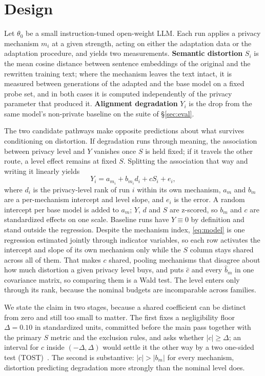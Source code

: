 \section{\label{sec:design}Design}
Let $\theta_0$ be a small instruction-tuned open-weight LLM.
Each run applies a privacy mechanism $m_i$ at a given strength,
acting on either the adaptation data or the adaptation procedure,
and yields two measurements.
\textbf{Semantic distortion} $S_i$ is the mean cosine distance between sentence embeddings of the original and the rewritten training text;
where the mechanism leaves the text intact,
it is measured between generations of the adapted and the base model on a fixed probe set,
and in both cases it is computed independently of the privacy parameter that produced it.
\textbf{Alignment degradation} $Y_i$ is the drop from the same model's non-private baseline on the suite of \S\ref{sec:eval}.

The two candidate pathways make opposite predictions about what survives conditioning on distortion.
If degradation runs through meaning,
the association between privacy level and $Y$ vanishes once $S$ is held fixed;
if it travels the other route,
a level effect remains at fixed $S$. Splitting the association that way and writing it linearly yields
\begin{equation}
  Y_i = a_{m_i} + b_{m_i} d_i + c S_i + e_i,
  \label{eq:model}
\end{equation}
where $d_i$ is the privacy-level rank of run $i$ within its own mechanism,
$a_m$ and $b_m$ are a per-mechanism intercept and level slope,
and $e_i$ is the error.
A random intercept per base model is added to $a_m$;
$Y$,
$d$ and $S$ are z-scored,
so $b_m$ and $c$ are standardized effects on one scale.
Baseline runs have $Y \equiv 0$ by definition and stand outside the regression.
Despite the mechanism index,
\eqref{eq:model} is one regression estimated jointly through indicator variables,
so each row activates the intercept and slope of its own mechanism only while the $S$ column stays shared across all of them.
That makes $c$ shared,
pooling mechanisms that disagree about how much distortion a given privacy level buys,
and puts $\hat c$ and every $\hat b_m$ in one covariance matrix,
so comparing them is a Wald test.
The level enters only through its rank,
because the nominal budgets are incomparable across families.

We state the claim in two stages,
because a shared coefficient can be distinct from zero and still too small to matter.
The first fixes a negligibility floor $\Delta = 0.10$ in standardized units,
committed before the main pass together with the primary $S$ metric and the exclusion rules,
and asks whether $|c| \ge \Delta$;
an interval for $c$ inside $(-\Delta, \Delta)$ would settle it the other way by a two one-sided test (TOST)~\citep{schuirmann1987comparison, lakens2018equivalence}.
The second is substantive:
$|c| > |b_m|$ for every mechanism,
distortion predicting degradation more strongly than the nominal level does.

